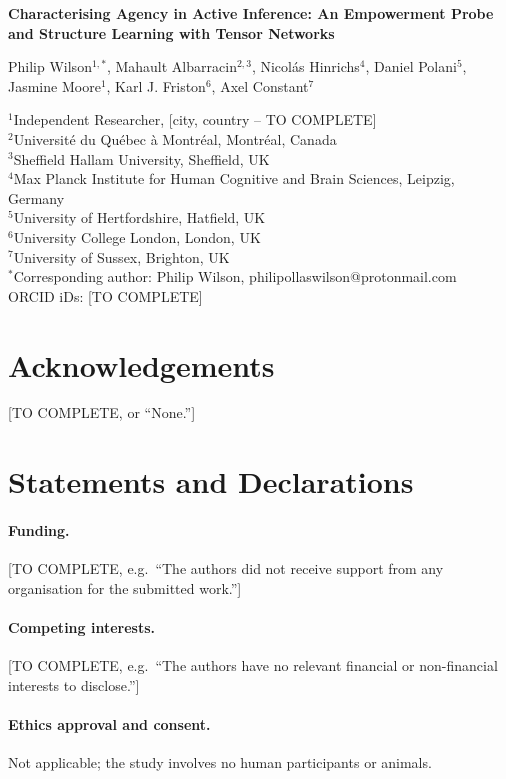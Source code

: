 \documentclass[11pt]{article}
\begin{document}
\begin{center}
{\Large\bfseries Characterising Agency in Active Inference: An Empowerment Probe and Structure Learning with Tensor Networks\par}
\bigskip
Philip Wilson$^{1,*}$, Mahault Albarracin$^{2,3}$, Nicol\'{a}s Hinrichs$^{4}$, Daniel Polani$^{5}$, Jasmine Moore$^{1}$, Karl J. Friston$^{6}$, Axel Constant$^{7}$
\end{center}

\noindent
$^{1}$Independent Researcher, [city, country -- TO COMPLETE]\\
$^{2}$Universit\'{e} du Qu\'{e}bec \`{a} Montr\'{e}al, Montr\'{e}al, Canada\\
$^{3}$Sheffield Hallam University, Sheffield, UK\\
$^{4}$Max Planck Institute for Human Cognitive and Brain Sciences, Leipzig, Germany\\
$^{5}$University of Hertfordshire, Hatfield, UK\\
$^{6}$University College London, London, UK\\
$^{7}$University of Sussex, Brighton, UK\\[4pt]
$^{*}$Corresponding author: Philip Wilson, philipollaswilson@protonmail.com\\
ORCID iDs: [TO COMPLETE]

\section*{Acknowledgements}
[TO COMPLETE, or ``None.'']

\section*{Statements and Declarations}
\paragraph{Funding.} [TO COMPLETE, e.g.\ ``The authors did not receive support from any organisation for the submitted work.'']

\paragraph{Competing interests.} [TO COMPLETE, e.g.\ ``The authors have no relevant financial or non-financial interests to disclose.'']

\paragraph{Ethics approval and consent.} Not applicable; the study involves no human participants or animals.
\end{document}
